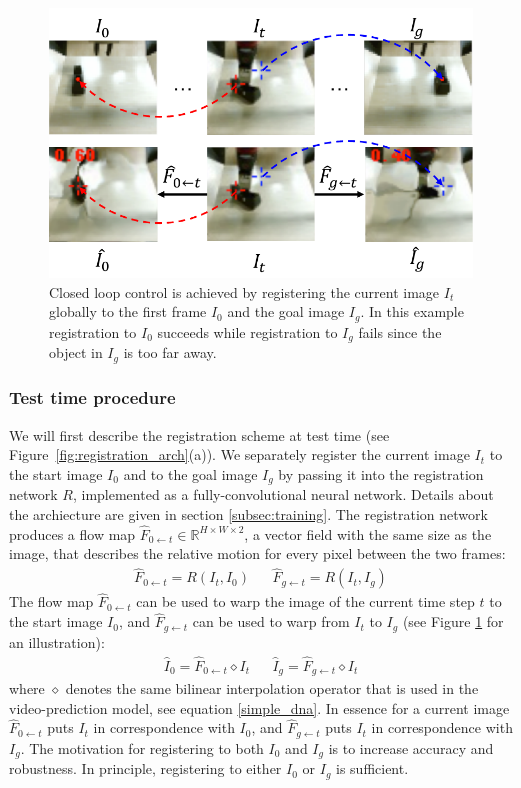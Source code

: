 \begin{figure}

	\centering
	\includegraphics[width=0.8\linewidth]{images_rfr/registration_singletime.pdf}
	\caption{\small{Closed loop control is achieved by registering the current image $I_t$ globally to the first frame $I_0$ and the goal image $I_g$. In this example registration to $I_0$ succeeds while registration to $I_g$ fails since the object in $I_g$ is too far away.}
		\label{fig:reg_single}
	}
\end{figure}

\subsubsection{Test time procedure}
We will first describe the registration scheme at test time (see Figure~\ref{fig:registration_arch}(a)). We separately register the current image $I_t$ to the start image $I_0$ and to the goal image $I_g$ by passing it into the registration network $R$, implemented as a fully-convolutional neural network. Details about the archiecture are given in section \ref{subsec:training}. The registration network produces a flow map $\hat{F}_{0 \leftarrow t} \in \mathbb{R}^{H \times W \times 2}$, a vector field with the same size as the image, that describes the relative motion for every pixel between the two frames:
\begin{align}
\hat{F}_{0 \leftarrow t} = R(I_t, I_0) &&
\hat{F}_{g \leftarrow t} = R(I_t, I_g)
\end{align}
The flow map $\hat{F}_{0 \leftarrow t}$ can be used to warp the image of the current time step $t$ to the start image $I_0$, and $\hat{F}_{g \leftarrow t}$ can be used to warp from $I_t$ to $I_g$ (see Figure \ref{fig:reg_single} for an illustration):
\begin{align}
\hat{I}_0 = \hat{F}_{0 \leftarrow t} \diamond  I_t &&
\hat{I}_g = \hat{F}_{g \leftarrow t} \diamond  I_t 
\end{align}
where $\diamond$ denotes the same bilinear interpolation operator that is used in the video-prediction model, see equation \ref{simple_dna}. In essence for a current image $\hat{F}_{0 \leftarrow t}$ puts $I_t$ in correspondence with $I_0$, and $\hat{F}_{g \leftarrow t}$ puts $I_t$ in correspondence with $I_g$. The motivation for registering to both $I_0$ and $I_g$ is to increase accuracy and robustness. In principle, registering to either $I_0$ or $I_g$ is sufficient.

